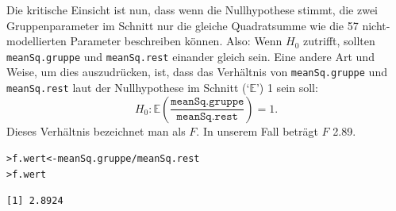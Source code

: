 \documentclass[oneside, 10pt]{book}\usepackage[]{graphicx}\usepackage[]{xcolor}
\makeatletter
\newcommand{\hlopt}[1]{\textcolor[rgb]{0,0,0}{#1}}%
\newcommand{\hlstd}[1]{\textcolor[rgb]{0.345,0.345,0.345}{#1}}%
\newcommand{\hlkwb}[1]{\textcolor[rgb]{0.69,0.353,0.396}{#1}}%
\newenvironment{kframe}{%
 \def\at@end@of@kframe{}%
 \ifinner\ifhmode%
  \def\at@end@of@kframe{\end{minipage}}%
  \begin{minipage}{\columnwidth}%
 \fi\fi%
 \def\FrameCommand##1{\hskip\@totalleftmargin \hskip-\fboxsep
 \colorbox{shadecolor}{##1}\hskip-\fboxsep
     \hskip-\linewidth \hskip-\@totalleftmargin \hskip\columnwidth}%
 \MakeFramed {\advance\hsize-\width
   \@totalleftmargin\z@ \linewidth\hsize
   \@setminipage}}%
 {\par\unskip\endMakeFramed%
 \at@end@of@kframe}
\newenvironment{knitrout}{}{} %
\makeatother
\begin{document}
Die kritische Einsicht ist nun, dass wenn die Nullhypothese
stimmt, die zwei Gruppenparameter im Schnitt nur die gleiche
Quadratsumme wie die 57 nicht-modellierten Parameter beschreiben
können. Also: Wenn $H_0$ zutrifft, sollten \texttt{meanSq.gruppe}
und \texttt{meanSq.rest} einander gleich sein. Eine andere
Art und Weise, um dies auszudrücken, ist, dass das Verhältnis von
\texttt{meanSq.gruppe} und \texttt{meanSq.rest} laut der Nullhypothese im Schnitt (`$\mathbb{E}$') 1
sein soll:
\[
H_0: \mathbb{E}\left(\frac{\texttt{meanSq.gruppe}}{\texttt{meanSq.rest}}\right) = 1.
\]
Dieses Verhältnis bezeichnet man als $F$.
In unserem Fall beträgt $F$ 2.89.
\begin{knitrout}
\color{fgcolor}\begin{kframe}
\begin{alltt}
\hlstd{> }\hlstd{f.wert} \hlkwb{<-} \hlstd{meanSq.gruppe} \hlopt{/} \hlstd{meanSq.rest}
\hlstd{> }\hlstd{f.wert}
\end{alltt}
\begin{verbatim}
[1] 2.8924
\end{verbatim}
\end{kframe}
\end{knitrout}
\end{document}
